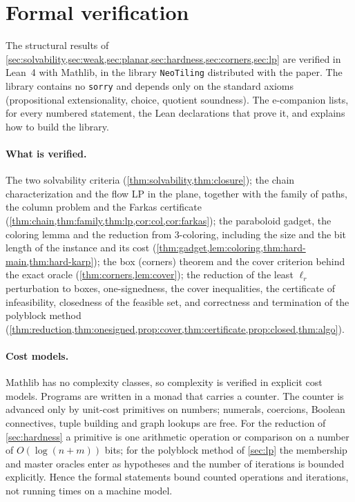 \section{Formal verification}\label{sec:lean}

The structural results of \cref{sec:solvability,sec:weak,sec:planar,sec:hardness,sec:corners,sec:lp} are verified in Lean~4 with Mathlib, in the library \texttt{NeoTiling} distributed with the paper. The library contains no \texttt{sorry} and depends only on the standard axioms (propositional extensionality, choice, quotient soundness). The e-companion lists, for every numbered statement, the Lean declarations that prove it, and explains how to build the library.

\paragraph{What is verified.} The two solvability criteria (\cref{thm:solvability,thm:closure}); the chain characterization and the flow LP in the plane, together with the family of paths, the column problem and the Farkas certificate (\cref{thm:chain,thm:family,thm:lp,cor:col,cor:farkas}); the paraboloid gadget, the coloring lemma and the reduction from 3-coloring, including the size and the bit length of the instance and its cost (\cref{thm:gadget,lem:coloring,thm:hard-main,thm:hard-karp}); the box (corners) theorem and the cover criterion behind the exact oracle (\cref{thm:corners,lem:cover}); the reduction of the least $\ell_r$ perturbation to boxes, one-signedness, the cover inequalities, the certificate of infeasibility, closedness of the feasible set, and correctness and termination of the polyblock method (\cref{thm:reduction,thm:onesigned,prop:cover,thm:certificate,prop:closed,thm:algo}).

\paragraph{Cost models.} Mathlib has no complexity classes, so complexity is verified in explicit cost models. Programs are written in a monad that carries a counter. The counter is advanced only by unit-cost primitives on numbers; numerals, coercions, Boolean connectives, tuple building and graph lookups are free. For the reduction of \cref{sec:hardness} a primitive is one arithmetic operation or comparison on a number of $O(\log(n+m))$ bits; for the polyblock method of \cref{sec:lp} the membership and master oracles enter as hypotheses and the number of iterations is bounded explicitly. Hence the formal statements bound counted operations and iterations, not running times on a machine model.

